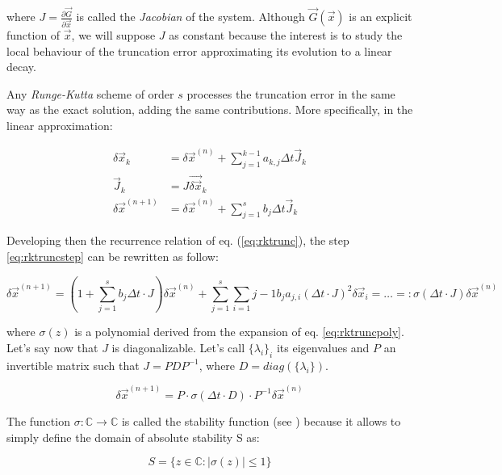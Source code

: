 \documentclass[final]{jpp}
\begin{document}
where $J = \frac{\partial \vec{G}}{\partial\vec{x}}$ is called the \textit{Jacobian} of the system. Although $\vec{G}(\vec{x})$ is an explicit function of $\vec{x}$, we will suppose $J$ as constant because the interest is to study the local behaviour of the truncation error approximating its evolution to a linear decay.

Any \textit{Runge-Kutta} scheme of order $s$ processes the truncation error in the same way as the exact solution, adding the same contributions. More specifically, in the linear approximation:

\begin{align} \label{eq:rktrunc}
\delta\vec{x}_k &= \delta\vec{x}^{(n)} + \sum_{j=1}^{k-1} a_{k,j} \Delta t \vec{J}_k \\
\vec{J}_k &= J \vec{\delta \vec{x}}_k \\
\delta\vec{x}^{(n+1)} &= \delta\vec{x}^{(n)} + \sum_{j=1}^{s} b_j \Delta t \vec{J}_k \label{eq:rktruncstep}
\end{align}

Developing then the recurrence relation of eq. (\ref{eq:rktrunc}), the step \ref{eq:rktruncstep} can be rewritten as follow:

\begin{equation} \label{eq:rktruncpoly}
\delta\vec{x}^{(n+1)} =  (1 + \sum_{j=1}^{s} b_j \Delta t \cdot J) \delta\vec{x}^{(n)} + \sum_{j=1}^{s} \sum_{i=1}{j-1} b_j a_{j,i} (\Delta t \cdot J)^2 \delta\vec{x}_i = \dots =: \sigma(\Delta t \cdot J) \delta\vec{x}^{(n)}
\end{equation}

where $\sigma(z)$ is a polynomial derived from the expansion of eq. \ref{eq:rktruncpoly}. 
Let's say now that $J$ is diagonalizable. Let's call $\{\lambda_i\}_i$ its eigenvalues and $P$ an invertible matrix such that $J = P D P^{-1}$, where $D = diag(\{\lambda_i\})$. 

\begin{equation} \label{eq:rktruncdiag}
\delta\vec{x}^{(n+1)} = P \cdot \sigma(\Delta t \cdot D) \cdot P^{-1} \delta\vec{x}^{(n)}
\end{equation}

The function $\sigma : \mathbb{C} \rightarrow \mathbb{C}$ is called the stability function (see \cite{springer}) because it allows to simply define the domain of absolute stability S as:

\begin{equation} \label{eq:stabdomain}
S = \{z \in \mathbb{C} : \lvert \sigma(z)\rvert \le 1 \}
\end{equation}
\end{document}
